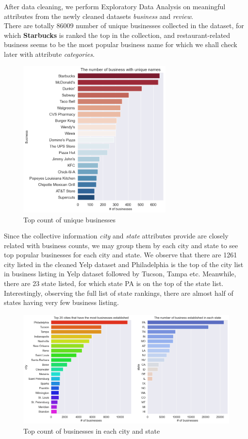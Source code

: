 \documentclass[runningheads]{llncs}
\begin{document}
After data cleaning, we perform Exploratory Data Analysis on meaningful attributes from the newly cleaned datasets \textit{business} and \textit{review}. \\
There are totally 86009 number of unique businesses collected in the dataset, for which \textbf{Starbucks} is ranked the top in the collection, and restaurant-related business seems to be the most popular business name for which we shall check later with attribute \textit{categories}. 

\begin{figure}[!h]
\centering
\includegraphics[height=8cm]{figs/name.png}
\caption{Top count of unique businesses}
\label{fig:name}
\end{figure}

Since the collective information \textit{city} and \textit{state} attributes provide are closely related with business counts, we may group them by each city and state to see top popular businesses for each city and state. We observe that there are 1261 city listed in the cleaned Yelp dataset and Philadelphia is the top of the city list in business listing in Yelp dataset followed by Tucson, Tampa etc. Meanwhile, there are 23 state listed, for which state PA is on the top of the state list. Interestingly, observing the full list of state rankings, there are almost half of states having very few business listing. 
\newpage
\begin{figure}[!h]
\centering
\includegraphics[height=6cm, width=12cm]{figs/citystate.png}
\caption{Top count of businesses in each city and state}
\label{fig:citystate}
\end{figure}
\end{document}
